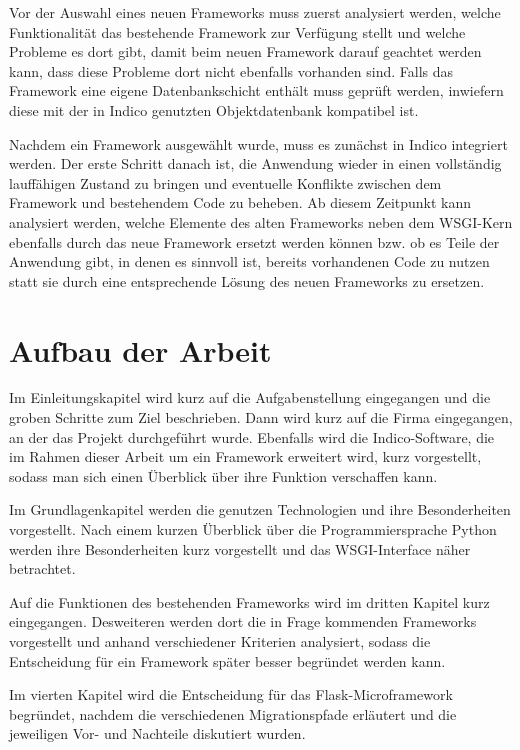 Vor der Auswahl eines neuen Frameworks muss zuerst analysiert werden, welche Funktionalität das
bestehende Framework zur Verfügung stellt und welche Probleme es dort gibt, damit beim neuen
Framework darauf geachtet werden kann, dass diese Probleme dort nicht ebenfalls vorhanden sind.
Falls das Framework eine eigene Datenbankschicht enthält muss geprüft werden, inwiefern diese mit
der in Indico genutzten Objektdatenbank kompatibel ist.

Nachdem ein Framework ausgewählt wurde, muss es zunächst in Indico integriert werden. Der erste
Schritt danach ist, die Anwendung wieder in einen vollständig lauffähigen Zustand zu bringen und
eventuelle Konflikte zwischen dem Framework und bestehendem Code zu beheben. Ab diesem Zeitpunkt kann
analysiert werden, welche Elemente des alten Frameworks neben dem WSGI-Kern ebenfalls durch das neue
Framework ersetzt werden können bzw. ob es Teile der Anwendung gibt, in denen es sinnvoll ist,
bereits vorhandenen Code zu nutzen statt sie durch eine entsprechende Lösung des neuen Frameworks zu
ersetzen.


\section{Aufbau der Arbeit}

Im Einleitungskapitel wird kurz auf die Aufgabenstellung eingegangen und die groben Schritte zum
Ziel beschrieben. Dann wird kurz auf die Firma eingegangen, an der das Projekt durchgeführt
wurde.
Ebenfalls wird die Indico-Software, die im Rahmen dieser Arbeit um ein Framework erweitert wird,
kurz vorgestellt, sodass man sich einen Überblick über ihre Funktion verschaffen kann.

Im Grundlagenkapitel werden die genutzen Technologien und ihre Besonderheiten vorgestellt. Nach
einem kurzen Überblick über die Programmiersprache Python werden ihre Besonderheiten kurz
vorgestellt und das WSGI-Interface näher betrachtet.

Auf die Funktionen des bestehenden Frameworks wird im dritten Kapitel kurz eingegangen. Desweiteren
werden dort die in Frage kommenden Frameworks vorgestellt und anhand verschiedener Kriterien
analysiert, sodass die Entscheidung für ein Framework später besser begründet werden kann.

Im vierten Kapitel wird die Entscheidung für das Flask-Microframework begründet, nachdem die
verschiedenen Migrationspfade erläutert und die jeweiligen Vor- und Nachteile diskutiert wurden.

